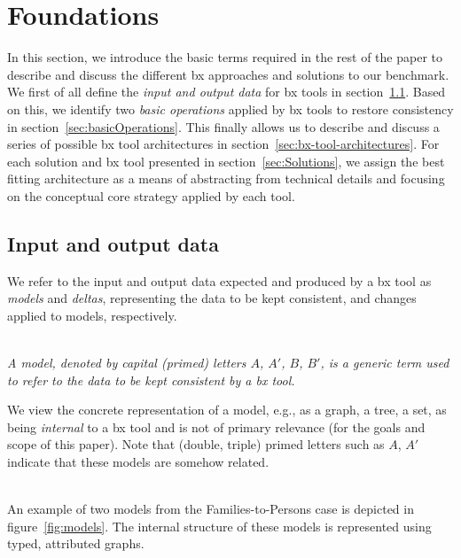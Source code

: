 \section{Foundations}
\label{sec:Foundations}


In this section, we introduce the basic terms required in the rest of the paper to describe and discuss the different bx approaches and solutions to our benchmark.
We first of all define the \emph{input and output data} for bx tools in section~\ref{sec:io-data}.
Based on this, we identify two \emph{basic operations} applied by bx tools to restore consistency in section~\ref{sec:basicOperations}.
This finally allows us to describe and discuss a series of possible bx tool architectures in section~\ref{sec:bx-tool-architectures}.
For each solution and bx tool presented in section~\ref{sec:Solutions}, we assign the best fitting architecture as a means of abstracting from technical details and focusing on the conceptual core strategy applied by each tool.   

\subsection{Input and output data}
\label{sec:io-data}

We refer to the input and output data expected and produced by a bx tool as \emph{models} and \emph{deltas}, representing the data to be kept consistent, and changes applied to models, respectively.  

\begin{definition}[Model]
\label{def: model}~\\
\emph{A model, denoted by capital (primed) letters $A$, $A'$, $B$, $B'$, is a generic term used to refer to the data to be kept consistent by a bx tool.}
\end{definition}
%
We view the concrete representation of a model, e.g., as a graph, a tree, a set, as being \emph{internal} to a bx tool and is not of primary relevance (for the goals and scope of this paper).
Note that (double, triple) primed letters such as $A$, $A'$ indicate that these models are somehow related.

\begin{example}[Models]~\\
An example of two models from the Families-to-Persons case is depicted in figure~\ref{fig:models}.
The internal structure of these models is represented using typed, attributed graphs.
\end{example}

